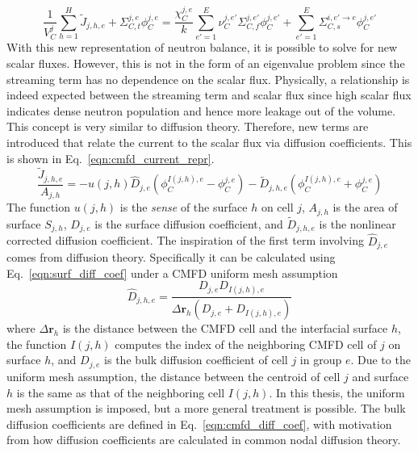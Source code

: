 \begin{equation}
	\frac{1}{V_C^j} \sum_{h=1}^H \tilde{J}_{j,h,e} + \Sigma_{C,t}^{j,e} \phi_C^{j,e} = \frac{\chi_C^{j,e}}{k} \sum_{e'=1}^{E} \nu_C^{j, e'} \Sigma_{C,f}^{j,e'} \phi_C^{j,e'} + \sum_{e'=1}^E  \Sigma_{C,s}^{i, e' \rightarrow e} \phi_C^{j,e'}
	\label{eqn:transport_partial_current_1}
\end{equation}
With this new representation of neutron balance, it is possible to solve for new scalar fluxes. However, this is not in the form of an eigenvalue problem since the streaming term has no dependence on the scalar flux. Physically, a relationship is indeed expected between the streaming term and scalar flux since high scalar flux indicates dense neutron population and hence more leakage out of the volume. This concept is very similar to diffusion theory. Therefore, new terms are introduced that relate the current to the scalar flux via diffusion coefficients. This is shown in Eq.~\ref{eqn:cmfd_current_repr}.
\begin{equation}
	\frac{\tilde{J}_{j,h,e}}{A_{j,h}} = - u(j,h) \hat{D}_{j,e} \left(\phi_C^{I(j,h),e} - \phi_C^{j,e}\right) - \tilde{D}_{j,h,e} \left(\phi_C^{I(j,h),e} + \phi_C^{j,e}\right)
	\label{eqn:cmfd_current_repr}
\end{equation}
The function $u(j,h)$ is the \textit{sense} of the surface $h$ on cell $j$, $A_{j,h}$ is the area of surface $S_{j,h}$, $\hat{D}_{j,e}$ is the surface diffusion coefficient, and $\tilde{D}_{j,h,e}$ is the nonlinear corrected diffusion coefficient. The inspiration of the first term involving $\hat{D}_{j,e}$ comes from diffusion theory. Specifically it can be calculated using Eq.~\ref{eqn:surf_diff_coef} under a CMFD uniform mesh assumption
\begin{equation}
	\hat{D}_{j,h,e} = \frac{D_{j,e} D_{I(j,h),e}}{\Delta \mathbf{r}_h \left( D_{j,e} + D_{I(j,h),e} \right)}
	\label{eqn:surf_diff_coef}
\end{equation}
where $\Delta \mathbf{r}_h$ is the distance between the CMFD cell and the interfacial surface $h$, the function $I(j,h)$ computes the index of the neighboring CMFD cell of $j$ on surface $h$, and $D_{j,e}$ is the bulk diffusion coefficient of cell $j$ in group $e$. Due to the uniform mesh assumption, the distance between the centroid of cell $j$ and surface $h$ is the same as that of the neighboring cell $I(j,h)$. In this thesis, the uniform mesh assumption is imposed, but a more general treatment is possible. The bulk diffusion coefficients are defined in Eq.~\ref{eqn:cmfd_diff_coef}, with motivation from how diffusion coefficients are calculated in common nodal diffusion theory.
